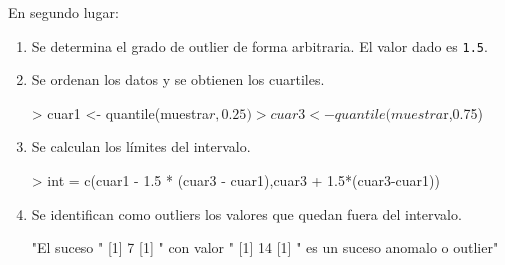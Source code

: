 \documentclass [a4paper] {article}
\begin{document}
\bigskip
En segundo lugar:
\begin{enumerate}
\item Se determina el grado de outlier de forma arbitraria. El valor dado es \texttt{1.5}.
\item Se ordenan los datos y se obtienen los cuartiles.
\begin{Schunk}
\begin{Sinput}
> cuar1 <- quantile(muestra$r,0.25)
> cuar3 <- quantile(muestra$r,0.75)
\end{Sinput}
\end{Schunk}

\item Se calculan los límites del intervalo.
\begin{Schunk}
\begin{Sinput}
> int = c(cuar1 - 1.5 * (cuar3 - cuar1),cuar3 + 1.5*(cuar3-cuar1))
\end{Sinput}
\end{Schunk}

\item Se identifican como outliers los valores que quedan fuera del intervalo.
\begin{Schunk}
\begin{Soutput}
[1] "El suceso "
[1] 7
[1] " con valor "
[1] 14
[1] " es un suceso anomalo o outlier"
\end{Soutput}
\end{Schunk}
\end{enumerate}
\end{document}
